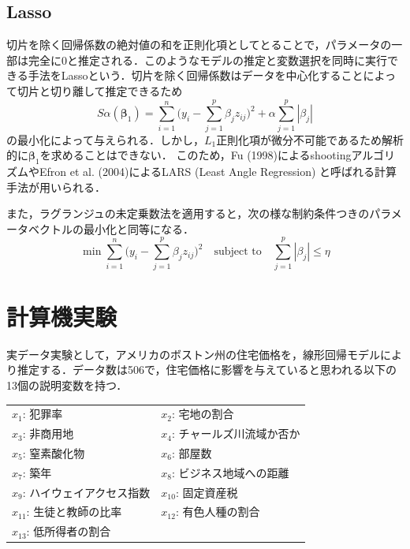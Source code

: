 \documentclass[a4paper,twocolumn]{ujarticle} %
\begin{document}
\subsection{Lasso}
切片を除く回帰係数の絶対値の和を正則化項としてとることで，パラメータの一部は完全に0と推定される．このようなモデルの推定と変数選択を同時に実行できる手法をLassoという．切片を除く回帰係数はデータを中心化することによって切片と切り離して推定できるため
\begin{equation}
        S\alpha(\bm\beta_1) = \sum_{i=1}^{n} \bigl(
        	y_i - \sum_{j=1}^{p} \beta_j z_{ij}
        \bigr)^2 + \alpha \sum_{j=1}^{p}|\beta_j|
\end{equation}
の最小化によって与えられる．しかし，$L_1$正則化項が微分不可能であるため解析的に$\bm{\beta}_1$を求めることはできない．
このため，Fu (1998)によるshootingアルゴリズムやEfron et al. (2004)によるLARS (Least Angle Regression) と呼ばれる計算手法が用いられる．

また，ラグランジュの未定乗数法を適用すると，次の様な制約条件つきのパラメータベクトルの最小化と同等になる．
\begin{equation}
	\min \sum_{i=1}^{n}\bigl(
		 y_i - \sum_{j=1}^{p} \beta_j z_{ij}
	\bigr)^2 \quad
	\text{subject to} \quad \sum_{j=1}^{p} |\beta_j| \leq \eta
\end{equation}
\section{計算機実験}
実データ実験として，アメリカのボストン州の住宅価格を，線形回帰モデルにより推定する．データ数は506で，住宅価格に影響を与えていると思われる以下の13個の説明変数を持つ．
\begin{table}[htb]
	\begin{tabular}{ll}
	$x_1$: 犯罪率  & $x_2$: 宅地の割合\\
	$x_3$: 非商用地 &  $x_4$: チャールズ川流域か否か\\
	$x_5$: 窒素酸化物 &  $x_6$: 部屋数\\
	$x_7$: 築年 &  $x_8$: ビジネス地域への距離\\
	$x_9$: ハイウェイアクセス指数 &  $x_{10}$: 固定資産税\\
	$x_{11}$: 生徒と教師の比率 &  $x_{12}$: 有色人種の割合\\
	$x_{13}$: 低所得者の割合\\
	\end{tabular}
\end{table}
\end{document}
